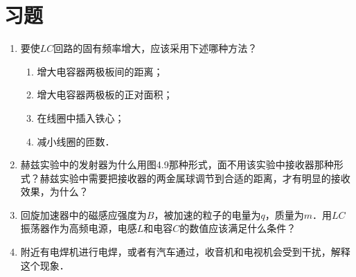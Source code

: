 \section*{习题}
\begin{enumerate}
	\item 要使$LC$回路的固有频率增大，应该采用下述哪种方法？
	\begin{enumerate}
		\item 增大电容器两极板间的距离；
		\item 增大电容器两极板的正对面积；
		\item 在线圈中插入铁心；
		\item 减小线圈的匝数．
	\end{enumerate}
	\item 赫兹实验中的发射器为什么用图4.9那种形式，面不用该实验中接收器那种形式？赫兹实验中需要把接收器的两金属球调节到合适的距离，才有明显的接收效果，为什么？
	\item 回旋加速器中的磁感应强度为$B$，被加速的粒子的电量为$q$，质量为$m$．用$LC$振荡器作为高频电源，电感$L$和电容$C$的数值应该满足什么条件？
	\item 附近有电焊机进行电焊，或者有汽车通过，收音机和电视机会受到干扰，解释这个现象．
\end{enumerate}













